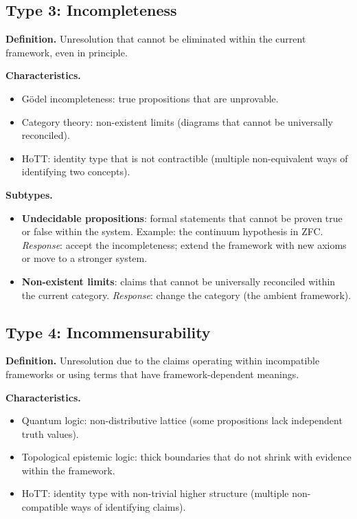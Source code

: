 \documentclass[11pt,letterpaper]{article}
\theoremstyle{definition}
\theoremstyle{remark}
\begin{document}
\subsection*{Type 3: Incompleteness}

\textbf{Definition.} Unresolution that cannot be eliminated within the current framework, even in principle.

\textbf{Characteristics.}
\begin{itemize}
\item Gödel incompleteness: true propositions that are unprovable.
\item Category theory: non-existent limits (diagrams that cannot be universally reconciled).
\item HoTT: identity type that is not contractible (multiple non-equivalent ways of identifying two concepts).
\end{itemize}

\textbf{Subtypes.}
\begin{itemize}
\item \textbf{Undecidable propositions}: formal statements that cannot be proven true or false within the system. Example: the continuum hypothesis in ZFC.
  \emph{Response}: accept the incompleteness; extend the framework with new axioms or move to a stronger system.

\item \textbf{Non-existent limits}: claims that cannot be universally reconciled within the current category.
  \emph{Response}: change the category (the ambient framework).
\end{itemize}

\subsection*{Type 4: Incommensurability}

\textbf{Definition.} Unresolution due to the claims operating within incompatible frameworks or using terms that have framework-dependent meanings.

\textbf{Characteristics.}
\begin{itemize}
\item Quantum logic: non-distributive lattice (some propositions lack independent truth values).
\item Topological epistemic logic: thick boundaries that do not shrink with evidence within the framework.
\item HoTT: identity type with non-trivial higher structure (multiple non-compatible ways of identifying claims).
\end{itemize}
\end{document}
